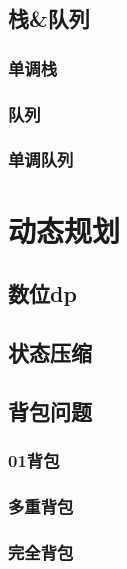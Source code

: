 \documentclass{ctexart}
\begin{document}
\subsection{栈\&队列}
\subsubsection{单调栈}

\subsubsection{队列}

\subsubsection{单调队列}



\section{动态规划}
\subsection{数位dp}

\subsection{状态压缩}

\subsection{背包问题}
\subsubsection{01背包}

\subsubsection{多重背包}

\subsubsection{完全背包}

\end{document}
